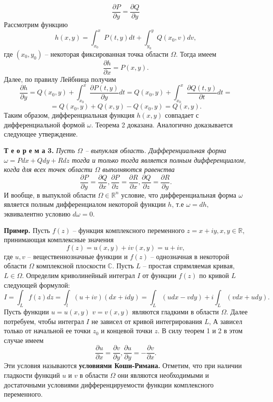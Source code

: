 \documentclass[12pt,titlepage]{report}
\begin{document}
\vskip 3mm
$$\frac{\partial P}{\partial y}=\frac{\partial Q}{\partial y}$$
\vskip 3mm
Рассмотрим функцию
\vskip 3mm
$$h(x,y)=\int_{x_{0}}^x P(t,y)dt+\int_{y_{0}}^y Q(x_{0},v)dv,$$
\vskip 3mm
где $(x_{0},y_{0})$ -- некоторая фиксированная точка области $\Omega.$ Тогда имеем 
\vskip 3mm
$$\frac{\partial h}{\partial x}=P(x,y).$$
\vskip 3mm
Далее, по правилу Лейбница получим
\vskip 3mm
$$\frac{\partial h}{\partial y}=Q(x_{0},y)+\int_{x_{0}}^x \frac{\partial P(t,y)}{\partial y} dt=Q(x_{0},y)+\int_{x_{0}}^x \frac{\partial Q(t,y)}{\partial t} dt=$$
\vskip 3mm
$$=Q(x_{0},y)+Q(x,y)-Q(x_{0},y)=Q(x,y).$$
\vskip 3mm
Таким образом, дифференциальная функция $h(x,y)$ совпадает с дифференциальной формой $\omega.$ Теорема 2 доказана.
Аналогично доказывается следующее утверждение.
\par\textbf{Т е о р е м а 3.} \textit{Пусть $\Omega$ -- выпуклая область. Дифференциальная форма $\omega=Pdx+Qdy+Rdz$ тогда и только тогда является полным дифференциалом, когда для всех точек области $\Omega$ выполняются равенства}
\vskip 3mm
$$\frac{\partial P}{\partial y}=\frac{\partial Q}{\partial x}, \frac{\partial P}{\partial z}=\frac{\partial R}{\partial x}, \frac{\partial Q}{\partial z}=\frac{\partial R}{\partial y}.$$
\vskip 3mm
И вообще, в выпуклой области $\Omega\in\mathbb{R}^n$ условие, что дифференциальная форма $\omega$ является полным дифференциалом некоторой функции $h$, т.е $\omega=dh,$ эквивалентно условию $d\omega=0.$
\par\textbf{Пример.} Пусть $f(z)$ -- функция комплексного переменного $z=x+iy, x,y\in\mathbb{R}$, принимающая комплексные значения 
\vskip 3mm
$$f(z)=u(x,y)+iv(x,y)=u+iv,$$
\vskip 3mm
где $u,v$ -- вещественнозначные функции и $f(z)$ -- однозначная в некоторой области $\Omega$ комплексной плоскости $\mathbb{C}$. Пусть $L$ -- простая спрямляемая кривая, $L\in\Omega.$
Определим криволинейный интеграл $I$ от функции $f(z)$ по кривой $L$ следующей формулой:
\vskip 3mm
$$I=\int_L f(z)dz=\int_l(u+iv)(dx+idy)=\int_L(udx-vdy)+i\int_L(vdx+udy).$$
\vskip 3mm
Пусть функции $u=u(x,y)$ $v=v(x,y)$ являются гладкими в области $\Omega.$ Далее потребуем, чтобы интеграл $I$ не зависел от кривой интегрирования $L$, А зависел только от начальной ее точки $z_{0}$ и концевой точки $z.$
В силу теорем 1 и 2 в этом случае имеем
\vskip 3mm
$$\frac{\partial u}{\partial x}=\frac{\partial v}{\partial y}, \frac{\partial u}{\partial y}= - \frac{\partial v}{\partial x}.$$
\vskip 3mm
Эти условия называются \textbf{условиями Коши-Римана.} Отметим, что при наличии гладкости функций $u$ и $v$ в области $\Omega$ они являются необходимыми и достаточными условиями дифференцируемости функции комплексного переменного.
\end{document}
